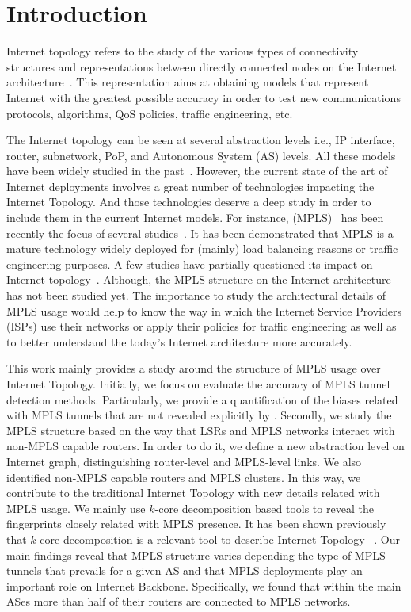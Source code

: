 \section{Introduction}\label{intro}
Internet topology refers to the study of the various types of
connectivity structures and representations between directly connected nodes on
the Internet architecture~\cite{Calvert97}. This representation aims at
obtaining models that represent  Internet with the greatest possible accuracy in order
to test new communications protocols, algorithms, QoS policies, traffic
engineering, etc.

The Internet topology can be seen at several abstraction levels i.e., IP
interface, router, subnetwork, PoP, and Autonomous System (AS) levels. All these
models have been widely studied in the past~\cite{DONNET13}. However, the
current state of the art of Internet deployments involves a great number of
technologies impacting the  Internet Topology.  And those technologies deserve a
deep study in order to include them in the current Internet models.  For instance, 
 (MPLS)~\cite{rfc3031} has been recently the
focus of several studies~\cite{SOM11,DONNET13,Vanaubel15}.  It has been
demonstrated that MPLS is a mature technology widely deployed for (mainly) load
balancing reasons or traffic engineering purposes.  A few studies have
partially questioned its impact on Internet topology~\cite{BRICE07,Flach2012}. 
Although, the MPLS structure on the Internet architecture has not been	
studied yet.  The importance to study  the architectural details of MPLS usage 
would help to know the way in
which the Internet Service Providers (ISPs) use their networks or apply their
policies for traffic engineering as well as to better understand the today's
Internet architecture more accurately. 

This work mainly provides a study around the
structure of MPLS usage over Internet Topology. Initially, we focus on evaluate the
accuracy of MPLS tunnel detection methods. Particularly, we provide a quantification 
of the biases related with MPLS tunnels that are not revealed explicitly by \traceroute.
Secondly, we study the MPLS structure based on the way that LSRs and MPLS networks interact with non-MPLS capable routers. In order to do it, we define a new abstraction level on 
Internet graph, distinguishing  router-level and MPLS-level links. We also
identified non-MPLS capable routers and  MPLS clusters. In this way, we contribute to 
the traditional Internet Topology with new details related with MPLS usage.
We mainly use $k$-core decomposition based tools to reveal the fingerprints
closely related with MPLS presence. It has been shown
previously that $k$-core decomposition is a relevant tool to describe
Internet Topology ~\cite{Alvarez06k, Serrano06, Serrano06, Alvarez08k}. 
Our main findings reveal that MPLS
structure varies depending the type of MPLS tunnels that prevails for a given
AS and that MPLS deployments play an important role on Internet Backbone. Specifically,
we found that within the main ASes more than half of their routers are connected to MPLS networks.

